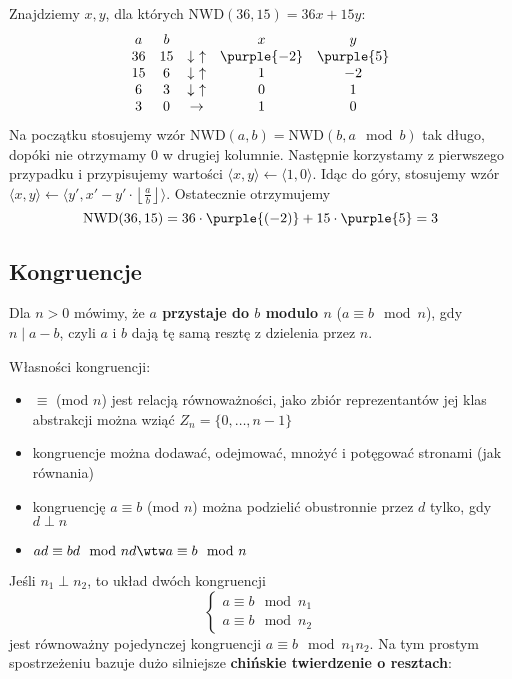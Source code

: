 \begin{example}
    Znajdziemy $x,y$, dla których $\mathrm{NWD}(36,15)=36x+15y$:
    $$
    \begin{matrix}
        a & b & & x & y \\
        36 & 15 & \downarrow\ \uparrow & \purple{-2} & \purple{5} \\
        15 & 6 & \downarrow\ \uparrow & 1 & -2 \\
        6 & 3 & \downarrow\ \uparrow & 0 & 1 \\
        3 & 0 & \rightarrow & 1 & 0
    \end{matrix}
    $$
    Na początku stosujemy wzór $\mathrm{NWD}(a,b)=\mathrm{NWD}(b,a\mod{b})$ tak długo, dopóki nie otrzymamy 0 w drugiej kolumnie. Następnie korzystamy z pierwszego przypadku i przypisujemy wartości $\langle x,y\rangle\leftarrow\langle1,0\rangle$. Idąc do góry, stosujemy wzór $\langle x,y\rangle\leftarrow\langle y',x'-y'\cdot\left\lfloor\frac{a}{b}\right\rfloor\rangle$. Ostatecznie otrzymujemy
    $$\mathrm{NWD}(36,15)=36\cdot\purple{(-2)}+15\cdot\purple{5}=3$$
\end{example}

\subsection{Kongruencje}

Dla $n>0$ mówimy, że \textbf{$a$ przystaje do $b$ modulo $n$} ($a\equiv b\mod{n}$), gdy $n\mid a-b$, czyli $a$ i $b$ dają tę samą resztę z dzielenia przez $n$.

Własności kongruencji:
\begin{itemize}
    \item $\equiv$ (mod $n$) jest relacją równoważności, jako zbiór reprezentantów jej klas abstrakcji można wziąć $Z_n=\{0,\ldots,n-1\}$
    \item kongruencje można dodawać, odejmować, mnożyć i potęgować stronami (jak równania)
    \item kongruencję $a\equiv b$ (mod $n$) można podzielić obustronnie przez $d$ tylko, gdy $d\perp n$
    \item $ad\equiv bd\mod{nd}\wtw a\equiv b\mod{n}$
\end{itemize}
\bigskip

Jeśli $n_1\perp n_2$, to układ dwóch kongruencji
$$
\begin{cases}
    a \equiv b \mod{n_1} \\
    a \equiv b \mod{n_2}
\end{cases}
$$
jest równoważny pojedynczej kongruencji $a\equiv b\mod{n_1n_2}$. Na tym prostym spostrzeżeniu bazuje dużo silniejsze \textbf{chińskie twierdzenie o resztach}:

